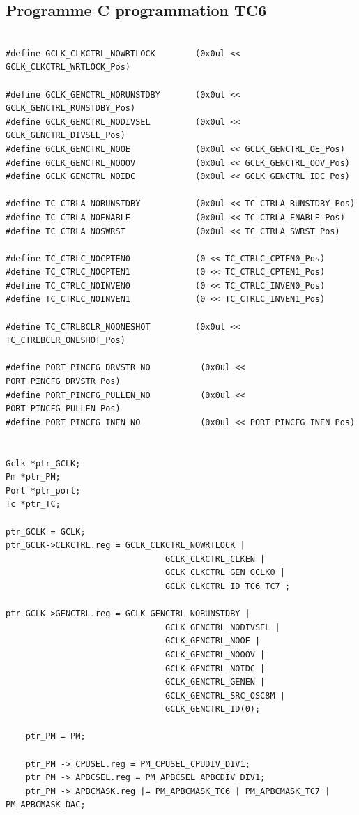 \documentclass[a4paper]{article}
\begin{document}
	\subsection{Programme C programmation TC6}
\begin{lstlisting}[style=CStyle]

#define GCLK_CLKCTRL_NOWRTLOCK        (0x0ul << GCLK_CLKCTRL_WRTLOCK_Pos)

#define GCLK_GENCTRL_NORUNSTDBY       (0x0ul << GCLK_GENCTRL_RUNSTDBY_Pos)
#define GCLK_GENCTRL_NODIVSEL         (0x0ul << GCLK_GENCTRL_DIVSEL_Pos)
#define GCLK_GENCTRL_NOOE             (0x0ul << GCLK_GENCTRL_OE_Pos)
#define GCLK_GENCTRL_NOOOV            (0x0ul << GCLK_GENCTRL_OOV_Pos)
#define GCLK_GENCTRL_NOIDC            (0x0ul << GCLK_GENCTRL_IDC_Pos)

#define TC_CTRLA_NORUNSTDBY           (0x0ul << TC_CTRLA_RUNSTDBY_Pos)
#define TC_CTRLA_NOENABLE             (0x0ul << TC_CTRLA_ENABLE_Pos)
#define TC_CTRLA_NOSWRST              (0x0ul << TC_CTRLA_SWRST_Pos)

#define TC_CTRLC_NOCPTEN0             (0 << TC_CTRLC_CPTEN0_Pos)
#define TC_CTRLC_NOCPTEN1             (0 << TC_CTRLC_CPTEN1_Pos)
#define TC_CTRLC_NOINVEN0             (0 << TC_CTRLC_INVEN0_Pos)
#define TC_CTRLC_NOINVEN1             (0 << TC_CTRLC_INVEN1_Pos)

#define TC_CTRLBCLR_NOONESHOT         (0x0ul << TC_CTRLBCLR_ONESHOT_Pos)

#define PORT_PINCFG_DRVSTR_NO          (0x0ul << PORT_PINCFG_DRVSTR_Pos)
#define PORT_PINCFG_PULLEN_NO          (0x0ul << PORT_PINCFG_PULLEN_Pos)
#define PORT_PINCFG_INEN_NO            (0x0ul << PORT_PINCFG_INEN_Pos)


Gclk *ptr_GCLK;
Pm *ptr_PM;
Port *ptr_port;
Tc *ptr_TC;

ptr_GCLK = GCLK;
ptr_GCLK->CLKCTRL.reg = GCLK_CLKCTRL_NOWRTLOCK |
								GCLK_CLKCTRL_CLKEN |
								GCLK_CLKCTRL_GEN_GCLK0 |
								GCLK_CLKCTRL_ID_TC6_TC7 ;

ptr_GCLK->GENCTRL.reg = GCLK_GENCTRL_NORUNSTDBY |
								GCLK_GENCTRL_NODIVSEL |
								GCLK_GENCTRL_NOOE |
								GCLK_GENCTRL_NOOOV |
								GCLK_GENCTRL_NOIDC |
								GCLK_GENCTRL_GENEN |
								GCLK_GENCTRL_SRC_OSC8M |
								GCLK_GENCTRL_ID(0);
									
	ptr_PM = PM;
	
	ptr_PM -> CPUSEL.reg = PM_CPUSEL_CPUDIV_DIV1;
	ptr_PM -> APBCSEL.reg = PM_APBCSEL_APBCDIV_DIV1;
	ptr_PM -> APBCMASK.reg |= PM_APBCMASK_TC6 | PM_APBCMASK_TC7 | PM_APBCMASK_DAC;
	

\end{lstlisting}
\end{document}

